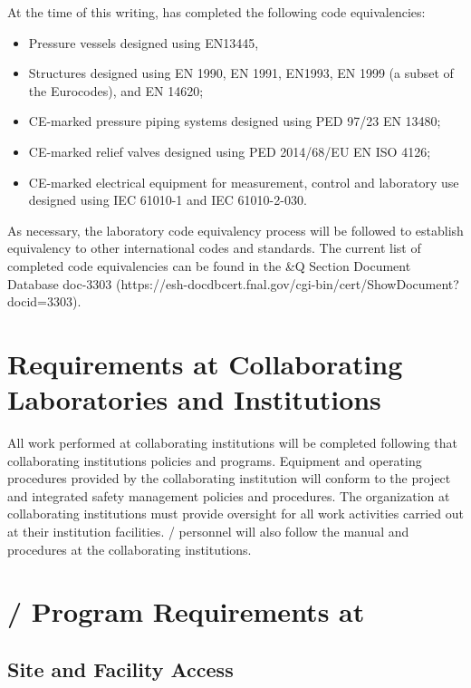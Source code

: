 At the time of this writing, \fnal has completed the following code
equivalencies:
\begin{itemize}
 \item Pressure vessels designed using EN13445,
 \item Structures designed using EN 1990, EN 1991, EN1993, EN 1999 (a
   subset of the Eurocodes), and EN 14620;
 \item CE-marked pressure piping systems designed using PED 97/23 EN 13480;
 \item CE-marked relief valves designed using PED 2014/68/EU EN ISO 4126;
 \item CE-marked electrical equipment for measurement, control and
   laboratory use designed using IEC 61010-1 and IEC 61010-2-030.
\end{itemize}

As necessary, the laboratory code equivalency process will be followed
to establish equivalency to other international codes and
standards. The current list of completed code equivalencies can be
found in the \&Q Section Document Database doc-3303
(https://esh-docdbcert.fnal.gov/cgi-bin/cert/ShowDocument?docid=3303).


\section{ Requirements at Collaborating Laboratories and Institutions}

All work performed at collaborating institutions will be completed
following that collaborating institutions  policies and
programs. Equipment and operating procedures provided by the
collaborating institution will conform to the  project
 and integrated safety management policies and
procedures. The  organization at collaborating institutions
must provide  oversight for all work activities carried
out at their institution facilities. /
personnel will also follow the  manual and procedures at
the collaborating institutions.

\section{/  Program Requirements at }

\subsection{Site and Facility Access}

